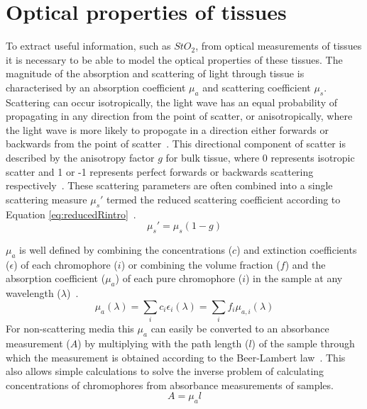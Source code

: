 \section{Optical properties of tissues}\label{sec:introoptics}
To extract useful information, such as $StO_2$, from optical measurements of tissues it is necessary to be able to model the optical properties of these tissues. The magnitude of the absorption and scattering of light through tissue is characterised by an absorption coefficient $\mu_a$ and scattering coefficient $\mu_s$. Scattering can occur isotropically, the light wave has an equal probability of propagating in any direction from the point of scatter, or anisotropically, where the light wave is more likely to propogate in a direction either forwards or backwards from the point of scatter~\citep{Jacques2013}. This directional component of scatter is described by the anisotropy factor $g$ for bulk tissue, where 0 represents isotropic scatter and 1 or -1 represents perfect forwards or backwards scattering respectively~\citep{Jacques2013}. These scattering parameters are often combined into a single scattering measure $\mu_s'$ termed the reduced scattering coefficient according to Equation \eqref{eq:reducedRintro}~\citep{Jacques2013}. 
\begin{equation}
    \mu_s' = \mu_s(1-g)
    \label{eq:reducedRintro}
\end{equation}

$\mu_a$ is well defined by combining the concentrations ($c$) and extinction coefficients ($\epsilon$) of each chromophore ($i$) or combining the volume fraction ($f$) and the absorption coefficient ($\mu_a$) of each pure chromophore ($i$) in the sample at any wavelength ($\lambda$)~\citep{Jacques2013, MacKenzie2018}. 
\begin{equation}
    \mu_a(\lambda) = \sum_i c_i \epsilon_i(\lambda) = \sum_i f_i \mu_{a, i}(\lambda)
    \label{eq:definemua}
\end{equation}
For non-scattering media this $\mu_a$ can easily be converted to an absorbance measurement ($A$) by multiplying with the path length ($l$) of the sample through which the measurement is obtained according to the Beer-Lambert law~\cite{MacKenzie2018}. This also allows simple calculations to solve the inverse problem of calculating concentrations of chromophores from absorbance measurements of samples. 
\begin{equation}
    A = \mu_al
\end{equation}

